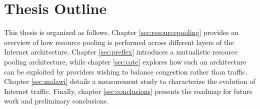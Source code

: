 \section{Thesis Outline}
\label{sec:introduction:outline}

This thesis is organized as follows.
Chapter \ref{sec:resourcepooling} provides an overview of how resource pooling is performed across different layers of the Internet architecture.
Chapter \ref{sec:preflex} introduces a mutualistic resource pooling architecture, while chapter \ref{sec:cate} explores how such an architecture can be exploited by providers wishing to balance congestion rather than traffic.
Chapter \ref{sec:malawi} details a measurement study to characterize the evolution of Internet traffic.
Finally, chapter \ref{sec:conclusions} presents the roadmap for future work and preliminary conclusions.

